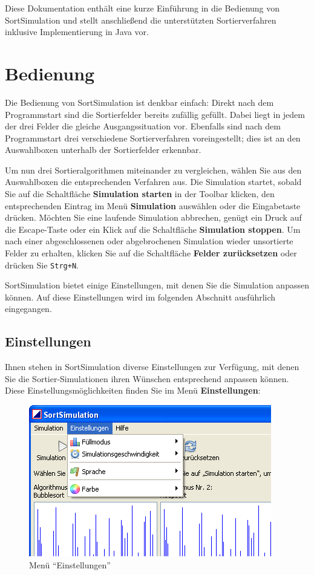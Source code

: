 \documentclass[11pt, a4paper, titlepage, oneside]{article}
\renewcommand{\emph}{\textbf}
\begin{document}
	Diese Dokumentation enthält eine kurze Einführung in die Bedienung von SortSimulation und stellt anschließend die unterstützten Sortierverfahren inklusive Implementierung in Java vor.
	
	\section{Bedienung}
	
	Die Bedienung von SortSimulation ist denkbar einfach: Direkt nach dem Programmstart sind die Sortierfelder bereits zufällig gefüllt. Dabei liegt in jedem der drei Felder die gleiche Ausgangssituation vor. Ebenfalls sind nach dem Programmstart drei verschiedene Sortierverfahren voreingestellt; dies ist an den Auswahlboxen unterhalb der Sortierfelder erkennbar.
	
	Um nun drei Sortieralgorithmen miteinander zu vergleichen, wählen Sie aus den Auswahlboxen die entsprechenden Verfahren aus. Die Simulation startet, sobald Sie auf die Schaltfläche \emph{Simulation starten} in der Toolbar klicken, den entsprechenden Eintrag im Menü \emph{Simulation} auswählen oder die Eingabetaste drücken. Möchten Sie eine laufende Simulation abbrechen, genügt ein Druck auf die Escape-Taste oder ein Klick auf die Schaltfläche \emph{Simulation stoppen}. Um nach einer abgeschlossenen oder abgebrochenen Simulation wieder unsortierte Felder zu erhalten, klicken Sie auf die Schaltfläche \emph{Felder zurücksetzen} oder drücken Sie \texttt{Strg+N}.
	
	SortSimulation bietet einige Einstellungen, mit denen Sie die Simulation anpassen können. Auf diese Einstellungen wird im folgenden Abschnitt ausführlich eingegangen.
	
	\subsection{Einstellungen}
	
	Ihnen stehen in SortSimulation diverse Einstellungen zur Verfügung, mit denen Sie die Sortier-Simulationen ihren Wünschen entsprechend anpassen können. Diese Ein\-{}stellungs\-{}mög\-{}lich\-{}kei\-{}ten finden Sie im Menü \emph{Einstellungen}:
	
	\begin{figure}[h]
		\centering
		\includegraphics[scale=0.6]{images/image1.png}
		\caption{Menü "`Einstellungen"'}
	\end{figure}
	
\end{document}
